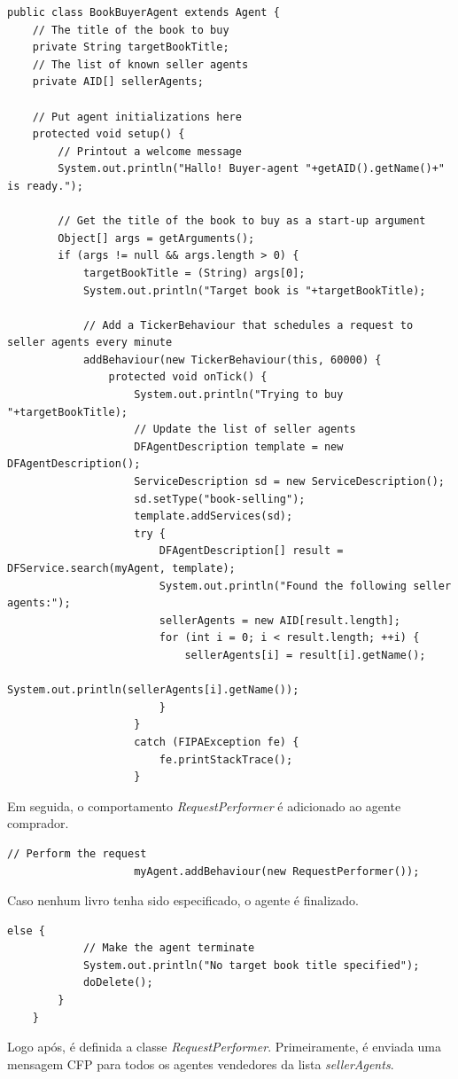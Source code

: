 \begin{lstlisting}[firstnumber=36]
public class BookBuyerAgent extends Agent {
	// The title of the book to buy
	private String targetBookTitle;
	// The list of known seller agents
	private AID[] sellerAgents;

	// Put agent initializations here
	protected void setup() {
		// Printout a welcome message
		System.out.println("Hallo! Buyer-agent "+getAID().getName()+" is ready.");

		// Get the title of the book to buy as a start-up argument
		Object[] args = getArguments();
		if (args != null && args.length > 0) {
			targetBookTitle = (String) args[0];
			System.out.println("Target book is "+targetBookTitle);

			// Add a TickerBehaviour that schedules a request to seller agents every minute
			addBehaviour(new TickerBehaviour(this, 60000) {
				protected void onTick() {
					System.out.println("Trying to buy "+targetBookTitle);
					// Update the list of seller agents
					DFAgentDescription template = new DFAgentDescription();
					ServiceDescription sd = new ServiceDescription();
					sd.setType("book-selling");
					template.addServices(sd);
					try {
						DFAgentDescription[] result = DFService.search(myAgent, template); 
						System.out.println("Found the following seller agents:");
						sellerAgents = new AID[result.length];
						for (int i = 0; i < result.length; ++i) {
							sellerAgents[i] = result[i].getName();
							System.out.println(sellerAgents[i].getName());
						}
					}
					catch (FIPAException fe) {
						fe.printStackTrace();
					}
\end{lstlisting}

Em seguida, o comportamento \textit{RequestPerformer} é adicionado ao agente comprador. 

\begin{lstlisting}[firstnumber=75]
					// Perform the request
					myAgent.addBehaviour(new RequestPerformer());
\end{lstlisting}

Caso nenhum livro tenha sido especificado, o agente é finalizado.

\begin{lstlisting}[firstnumber=80]
		else {
			// Make the agent terminate
			System.out.println("No target book title specified");
			doDelete();
		}
	}
\end{lstlisting}

Logo após, é definida a classe \textit{RequestPerformer}. Primeiramente, é enviada uma mensagem CFP para todos os agentes vendedores da lista \textit{sellerAgents}.  

